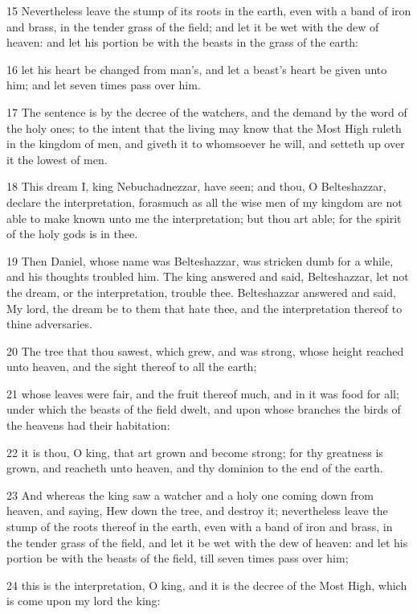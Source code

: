 \par 15 Nevertheless leave the stump of its roots in the earth, even with a band of iron and brass, in the tender grass of the field; and let it be wet with the dew of heaven: and let his portion be with the beasts in the grass of the earth:
\par 16 let his heart be changed from man's, and let a beast's heart be given unto him; and let seven times pass over him.
\par 17 The sentence is by the decree of the watchers, and the demand by the word of the holy ones; to the intent that the living may know that the Most High ruleth in the kingdom of men, and giveth it to whomsoever he will, and setteth up over it the lowest of men.
\par 18 This dream I, king Nebuchadnezzar, have seen; and thou, O Belteshazzar, declare the interpretation, forasmuch as all the wise men of my kingdom are not able to make known unto me the interpretation; but thou art able; for the spirit of the holy gods is in thee.
\par 19 Then Daniel, whose name was Belteshazzar, was stricken dumb for a while, and his thoughts troubled him. The king answered and said, Belteshazzar, let not the dream, or the interpretation, trouble thee. Belteshazzar answered and said, My lord, the dream be to them that hate thee, and the interpretation thereof to thine adversaries.
\par 20 The tree that thou sawest, which grew, and was strong, whose height reached unto heaven, and the sight thereof to all the earth;
\par 21 whose leaves were fair, and the fruit thereof much, and in it was food for all; under which the beasts of the field dwelt, and upon whose branches the birds of the heavens had their habitation:
\par 22 it is thou, O king, that art grown and become strong; for thy greatness is grown, and reacheth unto heaven, and thy dominion to the end of the earth.
\par 23 And whereas the king saw a watcher and a holy one coming down from heaven, and saying, Hew down the tree, and destroy it; nevertheless leave the stump of the roots thereof in the earth, even with a band of iron and brass, in the tender grass of the field, and let it be wet with the dew of heaven: and let his portion be with the beasts of the field, till seven times pass over him;
\par 24 this is the interpretation, O king, and it is the decree of the Most High, which is come upon my lord the king:
